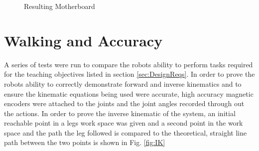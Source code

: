 \documentclass[12pt]{report}
\begin{document}
\begin{figure}[H]
%
    \caption{Resulting Motherboard}
    \label{fig:Motherboard}
\end{figure}




    
    
    
    
    
\section{Walking and Accuracy}
A series of tests were run to compare the robots ability to perform tasks required for the teaching objectives listed in section \ref{sec:DesignReqs}. In order to prove the robots ability to correctly demonstrate forward and inverse kinematics and to ensure the kinematic equations being used were accurate, high accuracy magnetic encoders were attached to the joints and the joint angles recorded through out the actions. In order to prove the inverse kinematic of the system, an initial reachable point in a legs work space was given and a second point in the work space  and the path the leg followed is compared to the theoretical, straight line path between the two points is shown in Fig. \ref{fig:IK}
\end{document}
